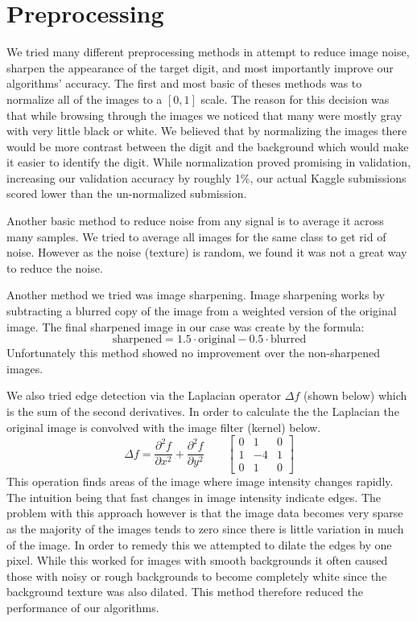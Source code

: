 \documentclass[10pt,twocolumn]{article}
\begin{document}
\section{Preprocessing}
We tried many different preprocessing methods in attempt to reduce image noise, sharpen the appearance of the target digit, and most importantly improve our algorithms' accuracy. The first and most basic of theses methods was to normalize all of the images to a $[0,1]$ scale. The reason for this decision was that while browsing through the images we noticed that many were mostly gray with very little black or white. We believed that by normalizing the images there would be more contrast between the digit and the background which would make it easier to identify the digit. While normalization proved promising in validation, increasing our validation accuracy by roughly 1\%, our actual Kaggle submissions scored lower than the un-normalized submission.

Another basic method to reduce noise from any signal is to average it across many samples.  We tried to average all images for the same class to get rid of noise. However as the noise (texture) is random, we found it was not a great way to reduce the noise.

Another method we tried was image sharpening. Image sharpening works by subtracting a blurred copy of the image from a weighted version of the original image. The final sharpened image in our case was create by the formula: \[\text{sharpened} = 1.5 \cdot \text{original} - 0.5 \cdot \text{blurred}\]
Unfortunately this method showed no improvement over the non-sharpened images.

We also tried edge detection via the Laplacian operator $\Delta f$ (shown below) which is the sum of the second derivatives. In order to calculate the the Laplacian the original image is convolved with the image filter (kernel)  below.
\[\Delta f = \frac{\partial^2 f}{\partial x^2} + \frac{\partial^2 f}{\partial y^2}
\qquad
\begin{bmatrix}
0 & 1 & 0 \\
1 & -4 & 1 \\
0 & 1 & 0
\end{bmatrix}
\]
This operation finds areas of the image where image intensity changes rapidly. The intuition being that fast changes in image intensity indicate edges. The problem with this approach however is that the image data becomes very sparse as the majority of the images tends to zero since there is little variation in much of the image. In order to remedy this we attempted to dilate the edges by one pixel. While this worked for images with smooth backgrounds it often caused those with noisy or rough backgrounds to become completely white since the background texture was also dilated. This method therefore reduced the performance of our algorithms.
\end{document}
